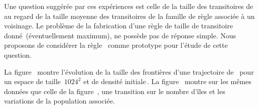 Une question suggérée par ces expériences est celle de la taille des
transitoires de~ au regard de la taille moyenne des
transitoires de la famille de règle associée à un voisinage. %
Le problème de la fabrication d'une règle de taille de
transitoire donné~(éventuellement maximum), ne possède pas de réponse
simple. %
Nous proposons de considérer la règle~ comme prototype
pour l'étude de cette question. %

\noindent%
La figure~ montre l'évolution de la taille
des frontières d'une trajectoire de~ pour un espace de
taille~$1024^2$ et de densité initiale\,\undemi. %
La figure~ montre sur les mêmes données que
celle de la figure~, une transition sur le
nombre d'îles et les variations de la population associée. %

